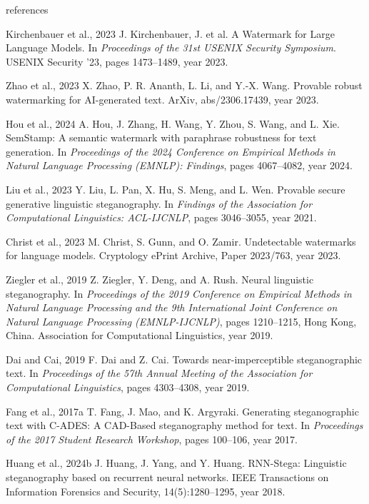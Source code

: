 \documentclass[sigconf,review,anonymous]{acmart}
\begin{document}
{\begin{thebibliography}{references}

\bibitem[ACM] Kirchenbauer et al., 2023
J. Kirchenbauer, J. et al.
\newblock A Watermark for Large Language Models.
In {\em Proceedings of the 31st USENIX Security Symposium}.
USENIX Security '23,
pages 1473--1489,
year 2023.
\endbibitem

\bibitem[ACM] Zhao et al., 2023
X. Zhao, P. R. Ananth, L. Li, and Y.-X. Wang.
\newblock Provable robust watermarking for AI-generated text.
ArXiv,
abs/2306.17439,
year 2023.
\endbibitem

\bibitem[ACM] Hou et al., 2024
A. Hou, J. Zhang, H. Wang, Y. Zhou, S. Wang, and L. Xie.
\newblock SemStamp: A semantic watermark with paraphrase robustness for text generation.
In {\em Proceedings of the 2024 Conference on Empirical Methods in Natural Language Processing (EMNLP): Findings},
pages 4067--4082,
year 2024.
\endbibitem

\bibitem[ACM] Liu et al., 2023
Y. Liu, L. Pan, X. Hu, S. Meng, and L. Wen.
\newblock Provable secure generative linguistic steganography.
In {\em Findings of the Association for Computational Linguistics: ACL-IJCNLP},
pages 3046--3055,
year 2021.
\endbibitem

\bibitem[ACM] Christ et al., 2023
M. Christ, S. Gunn, and O. Zamir.
\newblock Undetectable watermarks for language models.
Cryptology ePrint Archive, Paper 2023/763,
year 2023.
\endbibitem

\bibitem[ACM] Ziegler et al., 2019
Z. Ziegler, Y. Deng, and A. Rush.
\newblock Neural linguistic steganography.
In {\em Proceedings of the 2019 Conference on Empirical Methods in Natural Language Processing and the 9th International Joint Conference on Natural Language Processing (EMNLP-IJCNLP)},
pages 1210--1215, Hong Kong, China. Association for Computational Linguistics,
year 2019.
\endbibitem

\bibitem[ACM] Dai and Cai, 2019
F. Dai and Z. Cai.
\newblock Towards near-imperceptible steganographic text.
In {\em Proceedings of the 57th Annual Meeting of the Association for Computational Linguistics},
pages 4303--4308,
year 2019.
\endbibitem

\bibitem[ACM] Fang et al., 2017a
T. Fang, J. Mao, and K. Argyraki.
\newblock Generating steganographic text with C-ADES: A CAD-Based steganography method for text.
In {\em Proceedings of the 2017 Student Research Workshop},
pages 100--106,
year 2017.
\endbibitem

\bibitem[ACM] Huang et al., 2024b
J. Huang, J. Yang, and Y. Huang.
\newblock RNN-Stega: Linguistic steganography based on recurrent neural networks.
IEEE Transactions on Information Forensics and Security, 14(5):1280--1295,
year 2018.
\endbibitem


\end{thebibliography}}
\end{document}
